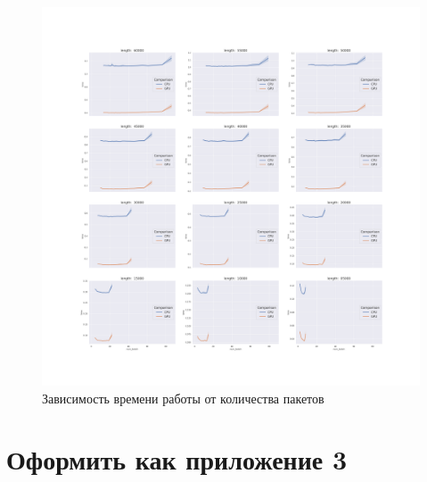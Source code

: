 \begin{figure}[h]
\centering
\includegraphics[width=\textwidth]{img/num_CPU_vs_GPU_Grid}
\caption{\label{fig:num_CPU_vs_GPU_Grid.}Зависимость времени работы от количества пакетов}
\end{figure}

\newpage
\section*{Оформить как приложение 3}
\label{sec:code}

